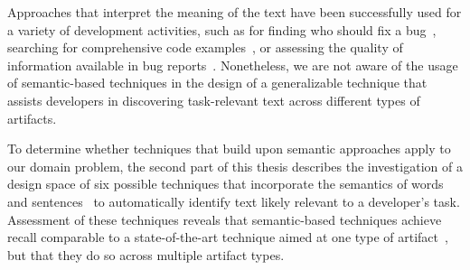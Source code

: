 









Approaches that interpret the meaning of the text have been successfully used for a variety of development activities,
such as for finding who should fix a bug~\cite{yang2016}, searching for comprehensive code examples~\cite{silva2019}, or assessing the quality of information available in bug reports~\cite{chaparro2019}.
Nonetheless, we are not aware of the usage of semantic-based techniques in the design of a generalizable technique that assists developers in discovering task-relevant text across different types of artifacts.





To determine whether
techniques that build upon semantic approaches 
apply to our domain problem,
the second part of this thesis describes 
the investigation of a design space
of six possible techniques that incorporate the semantics of words~\cite{Mikolov2013, Devlin2018Bert}
and sentences~\cite{fillmore1976frame, marques2021}
to automatically identify text likely relevant to a developer's task.
Assessment of these techniques reveals that semantic-based techniques
achieve recall comparable to a state-of-the-art technique aimed at one type of artifact~\cite{Xu2017}, but 
that they do so across
multiple artifact types.

